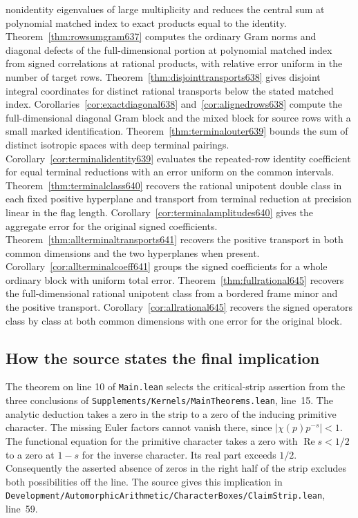 \documentclass[a4paper,11pt]{article}
\theoremstyle{definition}
\theoremstyle{remark}
\newcommand{\real}{\operatorname{Re}}\newcommand{\imag}{\operatorname{Im}}
\newcommand{\srcloc}[2]{{\small\nolinkurl{#1.lean}}, line~#2}
\numberwithin{equation}{section}
\begin{document}
nonidentity eigenvalues of large multiplicity and reduces the central sum at polynomial matched index to exact products equal to the identity. Theorem~\ref{thm:rowsumgram637} computes the ordinary Gram norms and diagonal defects of the full-dimensional portion at polynomial matched index from signed correlations at rational products, with relative error uniform in the number of target rows. Theorem~\ref{thm:disjointtransports638} gives disjoint integral coordinates for distinct rational transports below the stated matched index. Corollaries~\ref{cor:exactdiagonal638} and~\ref{cor:alignedrows638} compute the full-dimensional diagonal Gram block and the mixed block for source rows with a small marked identification. Theorem~\ref{thm:terminalouter639} bounds the sum of distinct isotropic spaces with deep terminal pairings. Corollary~\ref{cor:terminalidentity639} evaluates the repeated-row identity coefficient for equal terminal reductions with an error uniform on the common intervals. Theorem~\ref{thm:terminalclass640} recovers the rational unipotent double class in each fixed positive hyperplane and transport from terminal reduction at precision linear in the flag length. Corollary~\ref{cor:terminalamplitudes640} gives the aggregate error for the original signed coefficients. Theorem~\ref{thm:allterminaltransports641} recovers the positive transport in both common dimensions and the two hyperplanes when present. Corollary~\ref{cor:allterminalcoeff641} groups the signed coefficients for a whole ordinary block with uniform total error. Theorem~\ref{thm:fullrational645} recovers the full-dimensional rational unipotent class from a bordered frame minor and the positive transport. Corollary~\ref{cor:allrational645} recovers the signed operators class by class at both common dimensions with one error for the original block.

\subsection{How the source states the final implication}\label{nav:I-34}
The theorem on line 10 of \nolinkurl{Main.lean} selects the
critical-strip assertion from the three conclusions of
\srcloc{Supplements/Kernels/MainTheorems}{15}.
The analytic deduction takes a zero in the strip to a zero
of the inducing primitive character. The missing Euler factors
cannot vanish there, since \(\lvert\chi(p)p^{-s}\rvert<1\).
The functional equation for the primitive character takes
a zero with \(\real s<1/2\) to a zero at \(1-s\) for the
inverse character. Its real part exceeds \(1/2\).
Consequently the asserted absence of zeros in the right half
of the strip excludes both possibilities off the line.
The source gives this implication in
\srcloc{Development/AutomorphicArithmetic/CharacterBoxes/ClaimStrip}{59}.
\end{document}
